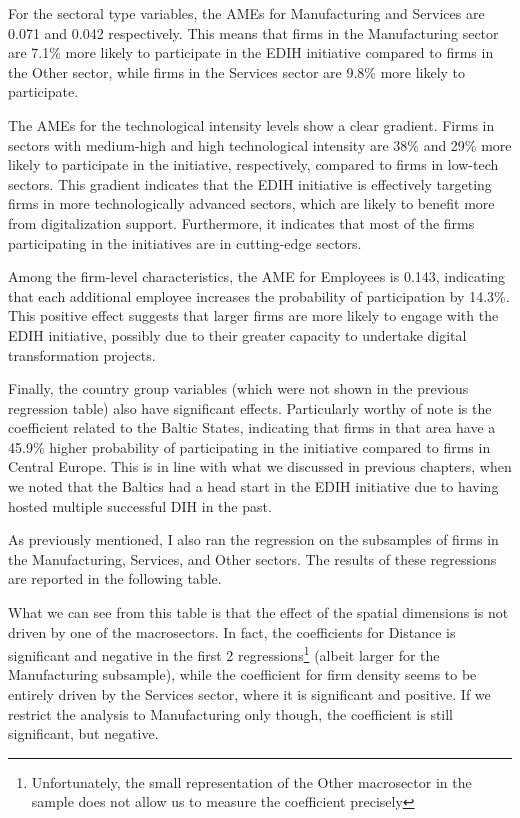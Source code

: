 \documentclass[12pt]{report}
\begin{document}
\par For the sectoral type variables, the AMEs for Manufacturing and Services are 0.071 and 0.042 respectively. This means that firms in the Manufacturing sector are 7.1\% more likely to participate in the EDIH initiative compared to firms in the Other sector, while firms in the Services sector are 9.8\% more likely to participate.

\par The AMEs for the technological intensity levels show a clear gradient. Firms in sectors with medium-high and high technological intensity are 38\% and 29\% more likely to participate in the initiative, respectively, compared to firms in low-tech sectors. This gradient indicates that the EDIH initiative is effectively targeting firms in more technologically advanced sectors, which are likely to benefit more from digitalization support. Furthermore, it indicates that most of the firms participating in the initiatives are in cutting-edge sectors.

\par Among the firm-level characteristics, the AME for Employees is 0.143, indicating that each additional employee increases the probability of participation by 14.3\%. This positive effect suggests that larger firms are more likely to engage with the EDIH initiative, possibly due to their greater capacity to undertake digital transformation projects.

\par Finally, the country group variables (which were not shown in the previous regression table) also have significant effects. Particularly worthy of note is the coefficient related to the Baltic States, indicating that firms in that area have a 45.9\% higher probability of participating in the initiative compared to firms in Central Europe. This is in line with what we discussed in previous chapters, when we noted that the Baltics had a head start in the EDIH initiative due to having hosted multiple successful DIH in the past.





\par As previously mentioned, I also ran the regression on the subsamples of firms in the Manufacturing, Services, and Other sectors. The results of these regressions are reported in the following table.



\par What we can see from this table is that the effect of the spatial dimensions is not driven by one of the macrosectors. In fact, the coefficients for Distance is significant and negative in the first 2 regressions\footnote{Unfortunately, the small representation of the Other macrosector in the sample does not allow us to measure the coefficient precisely} (albeit larger for the Manufacturing subsample), while the coefficient for firm density seems to be entirely driven by the Services sector, where it is significant and positive. If we restrict the analysis to Manufacturing only though, the coefficient is still significant, but negative.
\end{document}
